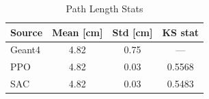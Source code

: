 \begin{table}[H]
\centering
\caption{Path Length Stats}
\label{tab:path_length_stats}
\begin{tabular}{lccc}
\toprule
\textbf{Source} & \textbf{Mean [cm]} & \textbf{Std [cm]} & \textbf{KS stat} \\
\midrule
Geant4 & 4.82 & 0.75 & --- \\
PPO & 4.82 & 0.03 & 0.5568 \\
SAC & 4.82 & 0.03 & 0.5483 \\
\bottomrule
\end{tabular}
\end{table}
